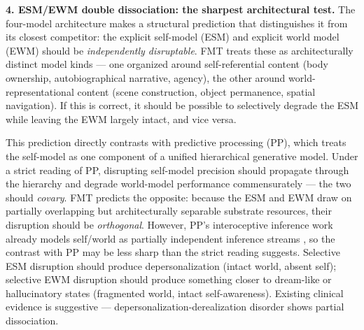 \documentclass[12pt]{article}
\newcommand{\revstart}{}
\begin{document}
{\revstart\textbf{4. ESM/EWM double dissociation: the sharpest architectural test.} The four-model architecture makes a structural prediction that distinguishes it from its closest competitor: the explicit self-model (ESM) and explicit world model (EWM) should be \emph{independently disruptable}. FMT treats these as architecturally distinct model kinds --- one organized around self-referential content (body ownership, autobiographical narrative, agency), the other around world-representational content (scene construction, object permanence, spatial navigation). If this is correct, it should be possible to selectively degrade the ESM while leaving the EWM largely intact, and vice versa.

This prediction directly contrasts with predictive processing (PP), which treats the self-model as one component of a unified hierarchical generative model. Under a strict reading of PP, disrupting self-model precision should propagate through the hierarchy and degrade world-model performance commensurately --- the two should \emph{covary}. FMT predicts the opposite: because the ESM and EWM draw on partially overlapping but architecturally separable substrate resources, their disruption should be \emph{orthogonal}. However, PP's interoceptive inference work already models self/world as partially independent inference streams \citep{Seth2021}, so the contrast with PP may be less sharp than the strict reading suggests. Selective ESM disruption should produce depersonalization (intact world, absent self); selective EWM disruption should produce something closer to dream-like or hallucinatory states (fragmented world, intact self-awareness). Existing clinical evidence is suggestive --- depersonalization-derealization disorder shows partial dissociation.

}
\end{document}
